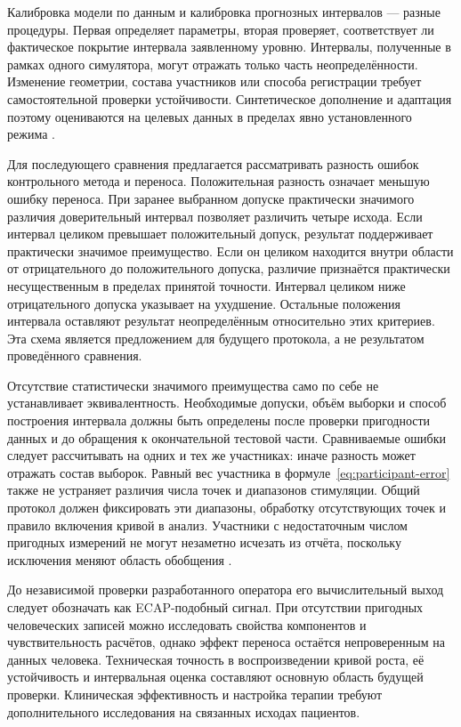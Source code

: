 Калибровка модели по данным и калибровка прогнозных интервалов --- разные процедуры. Первая определяет параметры, вторая проверяет, соответствует ли фактическое покрытие интервала заявленному уровню. Интервалы, полученные в рамках одного симулятора, могут отражать только часть неопределённости. Изменение геометрии, состава участников или способа регистрации требует самостоятельной проверки устойчивости. Синтетическое дополнение и адаптация поэтому оцениваются на целевых данных в пределах явно установленного режима \cite{s285,s836,s149}.

Для последующего сравнения предлагается рассматривать разность ошибок контрольного метода и переноса. Положительная разность означает меньшую ошибку переноса. При заранее выбранном допуске практически значимого различия доверительный интервал позволяет различить четыре исхода. Если интервал целиком превышает положительный допуск, результат поддерживает практически значимое преимущество. Если он целиком находится внутри области от отрицательного до положительного допуска, различие признаётся практически несущественным в пределах принятой точности. Интервал целиком ниже отрицательного допуска указывает на ухудшение. Остальные положения интервала оставляют результат неопределённым относительно этих критериев. Эта схема является предложением для будущего протокола, а не результатом проведённого сравнения.

Отсутствие статистически значимого преимущества само по себе не устанавливает эквивалентность. Необходимые допуски, объём выборки и способ построения интервала должны быть определены после проверки пригодности данных и до обращения к окончательной тестовой части. Сравниваемые ошибки следует рассчитывать на одних и тех же участниках: иначе разность может отражать состав выборок. Равный вес участника в формуле~\eqref{eq:participant-error} также не устраняет различия числа точек и диапазонов стимуляции. Общий протокол должен фиксировать эти диапазоны, обработку отсутствующих точек и правило включения кривой в анализ. Участники с недостаточным числом пригодных измерений не могут незаметно исчезать из отчёта, поскольку исключения меняют область обобщения \cite{posture,s105}.

До независимой проверки разработанного оператора его вычислительный выход следует обозначать как ECAP-подобный сигнал. При отсутствии пригодных человеческих записей можно исследовать свойства компонентов и чувствительность расчётов, однако эффект переноса остаётся непроверенным на данных человека. Техническая точность в воспроизведении кривой роста, её устойчивость и интервальная оценка составляют основную область будущей проверки. Клиническая эффективность и настройка терапии требуют дополнительного исследования на связанных исходах пациентов.

